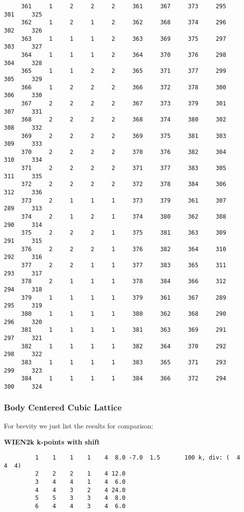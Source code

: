\begin{verbatim}
     361     1     2     2     2     361     367     373     295     301     325
     362     1     2     1     2     362     368     374     296     302     326
     363     1     1     1     2     363     369     375     297     303     327
     364     1     1     1     2     364     370     376     298     304     328
     365     1     1     2     2     365     371     377     299     305     329
     366     1     2     2     2     366     372     378     300     306     330
     367     2     2     2     2     367     373     379     301     307     331
     368     2     2     2     2     368     374     380     302     308     332
     369     2     2     2     2     369     375     381     303     309     333
     370     2     2     2     2     370     376     382     304     310     334
     371     2     2     2     2     371     377     383     305     311     335
     372     2     2     2     2     372     378     384     306     312     336
     373     2     1     1     1     373     379     361     307     289     313
     374     2     1     2     1     374     380     362     308     290     314
     375     2     2     2     1     375     381     363     309     291     315
     376     2     2     2     1     376     382     364     310     292     316
     377     2     2     1     1     377     383     365     311     293     317
     378     2     1     1     1     378     384     366     312     294     318
     379     1     1     1     1     379     361     367     289     295     319
     380     1     1     1     1     380     362     368     290     296     320
     381     1     1     1     1     381     363     369     291     297     321
     382     1     1     1     1     382     364     370     292     298     322
     383     1     1     1     1     383     365     371     293     299     323
     384     1     1     1     1     384     366     372     294     300     324
\end{verbatim}

\subsubsection{Body Centered Cubic Lattice}

For brevity we just list the results for comparison:

{\bf WIEN2k k-points with shift}

\begin{verbatim}
         1    1    1    1    4  8.0 -7.0  1.5       100 k, div: (  4  4  4)
         2    2    2    1    4 12.0
         3    4    4    1    4  6.0
         4    4    3    2    4 24.0
         5    5    3    3    4  8.0
         6    4    4    3    4  6.0
\end{verbatim}

